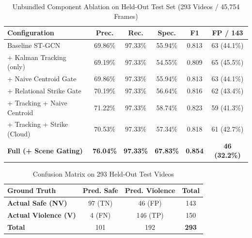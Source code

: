 \documentclass[conference]{IEEEtran}
\begin{document}
\begin{table}[htbp]
\caption{Unbundled Component Ablation on Held-Out Test Set (293 Videos / 45,754 Frames)}
\begin{center}
\begin{tabular}{lccccc}
\toprule
\textbf{Configuration} & \textbf{Prec.} & \textbf{Rec.} & \textbf{Spec.} & \textbf{F1} & \textbf{FP / 143} \\
\midrule
Baseline ST-GCN & 69.86\% & 97.33\% & 55.94\% & 0.813 & 63 (44.1\%) \\
+ Kalman Tracking (only) & 69.19\% & 97.33\% & 54.55\% & 0.809 & 65 (45.5\%) \\
+ Naive Centroid Gate & 69.86\% & 97.33\% & 55.94\% & 0.813 & 63 (44.1\%) \\
+ Relational Strike Gate & 70.19\% & 97.33\% & 56.64\% & 0.816 & 62 (43.4\%) \\
+ Tracking + Naive Centroid & 71.22\% & 97.33\% & 58.74\% & 0.823 & 59 (41.3\%) \\
+ Tracking + Strike (Cloud) & 70.53\% & 97.33\% & 57.34\% & 0.818 & 61 (42.7\%) \\
\midrule
\textbf{Full (+ Scene Gating)} & \textbf{76.04\%} & \textbf{97.33\%} & \textbf{67.83\%} & \textbf{0.854} & \textbf{46 (32.2\%)} \\
\bottomrule
\end{tabular}
\label{tab:ablation}
\end{center}
\end{table}

\begin{table}[htbp]
\caption{Confusion Matrix on 293 Held-Out Test Videos}
\begin{center}
\begin{tabular}{lcc|c}
\toprule
\textbf{Ground Truth} & \textbf{Pred. Safe} & \textbf{Pred. Violence} & \textbf{Total} \\
\midrule
\textbf{Actual Safe (NV)} & 97 (TN) & 46 (FP) & 143 \\
\textbf{Actual Violence (V)} & 4 (FN) & 146 (TP) & 150 \\
\midrule
\textbf{Total} & 101 & 192 & \textbf{293} \\
\bottomrule
\end{tabular}
\label{tab:cm}
\end{center}
\end{table}
\end{document}
